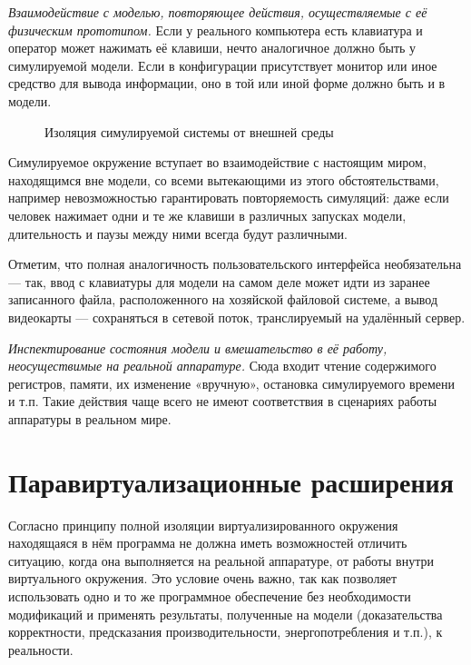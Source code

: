 \begin{enumerate*}
\item \textit{Взаимодействие с моделью, повторяющее действия, осуществляемые с её физическим прототипом.} Если у реального компьютера есть клавиатура и оператор может нажимать её клавиши, нечто аналогичное должно быть у симулируемой модели. Если в конфигурации присутствует монитор или иное средство для вывода информации, оно в той или иной форме должно быть и в модели. 

\begin{figure}[htp]
    \centering
    \caption{Изоляция симулируемой системы от внешней среды}
    \label{fig:isolate}
\end{figure}

Симулируемое окружение вступает во взаимодействие с настоящим миром, находящимся вне модели, со всеми вытекающими из этого обстоятельствами, например невозможностью гарантировать повторяемость симуляций: даже если человек нажимает одни и те же клавиши в различных запусках модели, длительность и паузы между ними всегда будут различными.

Отметим, что полная аналогичность пользовательского интерфейса необязательна — так, ввод с клавиатуры для модели на самом деле может идти из заранее записанного файла, расположенного на хозяйской файловой системе, а вывод видеокарты — сохраняться в сетевой поток, транслируемый на удалённый сервер.

\item \textit{Инспектирование состояния модели и вмешательство в её работу, неосуществимые на реальной аппаратуре.} Сюда входит чтение содержимого регистров, памяти, их изменение «вручную», остановка симулируемого времени и т.п. Такие действия чаще всего не имеют соответствия в сценариях работы аппаратуры в реальном мире.
\end{enumerate*}

\section{Паравиртуализационные расширения}

Согласно принципу полной изоляции виртуализированного окружения находящаяся в нём программа не должна иметь возможностей отличить ситуацию, когда она выполняется на реальной аппаратуре, от работы внутри виртуального окружения. Это условие очень важно, так как позволяет использовать одно и то же программное обеспечение без необходимости модификаций и применять результаты, полученные на модели (доказательства корректности, предсказания производительности, энергопотребления и т.п.), к реальности.

